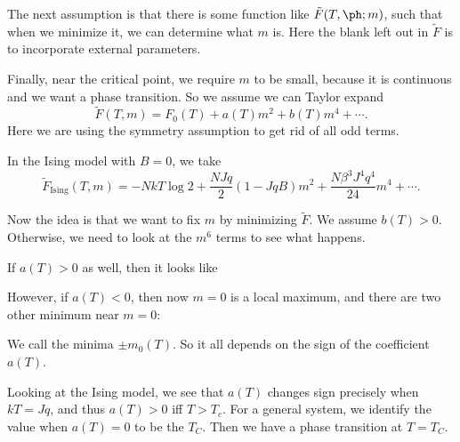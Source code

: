 \documentclass[a4paper]{article}
\begin{document}
The next assumption is that there is some function like $\tilde{F}(T, \ph; m)$, such that when we minimize it, we can determine what $m$ is. Here the blank left out in $\tilde{F}$ is to incorporate external parameters.

Finally, near the critical point, we require $m$ to be small, because it is continuous and we want a phase transition. So we assume we can Taylor expand
\[
  \tilde{F} (T, m) = F_0(T) + a(T) m^2 + b(T) m^4 + \cdots.
\]
Here we are using the symmetry assumption to get rid of all odd terms.

\begin{eg}
  In the Ising model with $B = 0$, we take
  \[
    \tilde{F}_{\mathrm{Ising}} (T, m) = -Nk T \log 2 + \frac{NJq}{2} (1 - JqB) m^2 + \frac{N\beta^3 J^4 q^4}{24} m^4 + \cdots.
  \]
\end{eg}

Now the idea is that we want to fix $m$ by minimizing $\tilde{F}$. We assume $b(T) > 0$. Otherwise, we need to look at the $m^6$ terms to see what happens.

If $a(T) > 0$ as well, then it looks like
\begin{center}
\end{center}
However, if $a(T) < 0$, then now $m = 0$ is a local maximum, and there are two other minimum near $m = 0$:
\begin{center}
\end{center}
We call the minima $\pm m_0(T)$. So it all depends on the sign of the coefficient $a(T)$.

Looking at the Ising model, we see that $a(T)$ changes sign precisely when $kT = Jq$, and thus $a(T) > 0$ iff $T > T_c$. For a general system, we identify the value when $a(T) = 0$ to be the  $T_C$. Then we have a phase transition at $T = T_C$.
\end{document}
